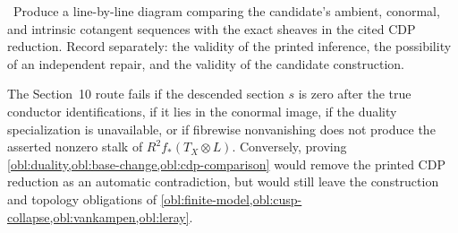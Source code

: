 \begin{obligation}\label{obl:cdp-comparison}
\Open\ Produce a line-by-line diagram comparing the candidate's
ambient, conormal, and intrinsic cotangent sequences with the exact sheaves
in the cited CDP reduction. Record separately: the validity of the printed
inference, the possibility of an independent repair, and the validity of
the candidate construction.
\end{obligation}

\begin{test}
The Section~10 route fails if the descended section $s$ is zero after the
true conductor identifications, if it lies in the conormal image, if the
duality specialization is unavailable, or if fibrewise nonvanishing does
not produce the asserted nonzero stalk of $R^2f_*(T_X\otimes L)$.
Conversely, proving \cref{obl:duality,obl:base-change,obl:cdp-comparison}
would remove the printed CDP reduction as an automatic contradiction, but
would still leave the construction and topology obligations of
\cref{obl:finite-model,obl:cusp-collapse,obl:vankampen,obl:leray}.
\end{test}
